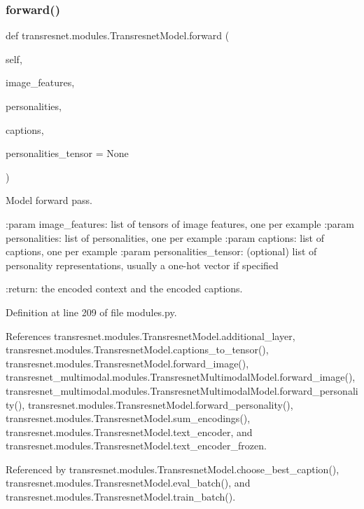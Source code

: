 \subsubsection{\texorpdfstring{forward()}{forward()}}
{\footnotesize\ttfamily def transresnet.\+modules.\+Transresnet\+Model.\+forward (\begin{DoxyParamCaption}\item[{}]{self,  }\item[{}]{image\+\_\+features,  }\item[{}]{personalities,  }\item[{}]{captions,  }\item[{}]{personalities\+\_\+tensor = {\ttfamily None} }\end{DoxyParamCaption})}

\begin{DoxyVerb}Model forward pass.

:param image_features:
    list of tensors of image features, one per example
:param personalities:
    list of personalities, one per example
:param captions:
    list of captions, one per example
:param personalities_tensor:
    (optional) list of personality representations, usually a one-hot
    vector if specified

:return:
    the encoded context and the encoded captions.
\end{DoxyVerb}
 

Definition at line 209 of file modules.\+py.



References transresnet.\+modules.\+Transresnet\+Model.\+additional\+\_\+layer, transresnet.\+modules.\+Transresnet\+Model.\+captions\+\_\+to\+\_\+tensor(), transresnet.\+modules.\+Transresnet\+Model.\+forward\+\_\+image(), transresnet\+\_\+multimodal.\+modules.\+Transresnet\+Multimodal\+Model.\+forward\+\_\+image(), transresnet\+\_\+multimodal.\+modules.\+Transresnet\+Multimodal\+Model.\+forward\+\_\+personality(), transresnet.\+modules.\+Transresnet\+Model.\+forward\+\_\+personality(), transresnet.\+modules.\+Transresnet\+Model.\+sum\+\_\+encodings(), transresnet.\+modules.\+Transresnet\+Model.\+text\+\_\+encoder, and transresnet.\+modules.\+Transresnet\+Model.\+text\+\_\+encoder\+\_\+frozen.



Referenced by transresnet.\+modules.\+Transresnet\+Model.\+choose\+\_\+best\+\_\+caption(), transresnet.\+modules.\+Transresnet\+Model.\+eval\+\_\+batch(), and transresnet.\+modules.\+Transresnet\+Model.\+train\+\_\+batch().


